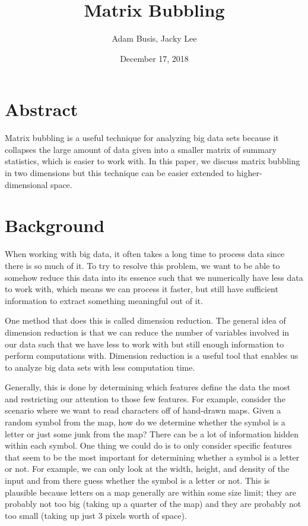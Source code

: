 \documentclass{article}
\title{Matrix Bubbling}
\author{Adam Busis, Jacky Lee}
\date{December 17, 2018}
\begin{document}
\nocite{*}

\maketitle

\section{Abstract}

Matrix bubbling is a useful technique for analyzing big data sets because it collapses the large amount of data given into a smaller matrix of summary statistics, which is easier to work with. In this paper, we discuss matrix bubbling in two dimensions but this technique can be easier extended to higher-dimensional space.

\section{Background}

When working with big data, it often takes a long time to process data since there is so much of it. To try to resolve this problem, we want to be able to somehow reduce this data into its essence such that we numerically have less data to work with, which means we can process it faster, but still have sufficient information to extract something meaningful out of it.

One method that does this is called dimension reduction. The general idea of dimension reduction is that we can reduce the number of variables involved in our data such that we have less to work with but still enough information to perform computations with. Dimension reduction is a useful tool that enables us to analyze big data sets with less computation time.

Generally, this is done by determining which features define the data the most and restricting our attention to those few features. For example, consider the scenario where we want to read characters off of hand-drawn maps. Given a random symbol from the map, how do we determine whether the symbol is a letter or just some junk from the map? There can be a lot of information hidden within each symbol. One thing we could do is to only consider specific features that seem to be the most important for determining whether a symbol is a letter or not. For example, we can only look at the width, height, and density of the input and from there guess whether the symbol is a letter or not. This is plausible because letters on a map generally are within some size limit; they are probably not too big (taking up a quarter of the map) and they are probably not too small (taking up just 3 pixels worth of space).
\end{document}
